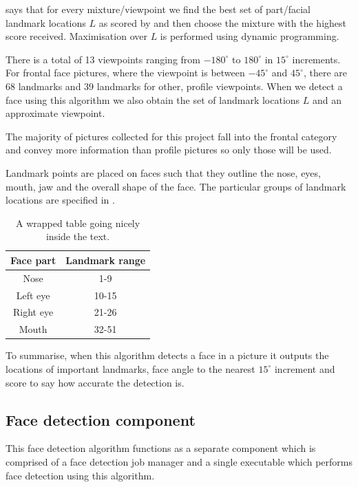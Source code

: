  says that for every mixture/viewpoint we find
the best set of part/facial landmark locations $L$ as scored by
 and then choose the mixture with the highest score
received. Maximisation over $L$ is performed using dynamic programming.

There is a total of 13 viewpoints ranging from $-180^\circ$ to $180^\circ$ in
$15^\circ$ increments. For frontal face pictures, where the viewpoint is
between $-45^\circ$ and $45^\circ$, there are 68 landmarks and 39 landmarks for
other, profile viewpoints. When we detect a face using this algorithm we also
obtain the set of landmark locations $L$ and an approximate viewpoint.

The majority of pictures collected for this project fall into the frontal
category and convey more information than profile pictures so only those will
be used.

Landmark points are placed on faces such that they outline the nose, eyes,
mouth, jaw and the overall shape of the face. The particular groups of landmark
locations are specified in .

\begin{table}
    \begin{tabular}{cc}\\\toprule  
        Face part & Landmark range \\\midrule
        Nose      & 1-9 \\  \midrule
        Left eye  & 10-15 \\  \midrule
        Right eye & 21-26\\  \midrule
        Mouth     & 32-51 \\  \bottomrule
    \end{tabular}
    \caption{A wrapped table going nicely inside the text.}
    \label{table:spec:fd:landmarks}
\end{table} 

To summarise, when this algorithm detects a face in a picture it outputs the 
locations of important landmarks, face angle to the nearest $15^\circ$
increment and score to say how accurate the detection is.

\subsection{Face detection component}
\label{spec:fd:component}
This face detection algorithm functions as a separate component which is
comprised of a face detection job manager and a single executable which
performs face detection using this algorithm.

